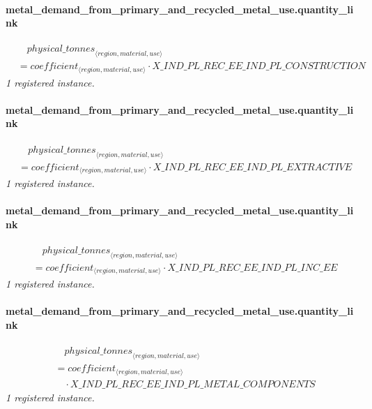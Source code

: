 \documentclass[11pt]{article}
\begin{document}
\paragraph{metal\_demand\_from\_primary\_and\_recycled\_metal\_use.quantity\_link}
\begin{align*}
&\quad {physical\_tonnes}_{\langle region, material, use\rangle}\\
&= coefficient_{\langle region, material, use\rangle} \cdot X\_IND\_PL\_REC\_EE\_IND\_PL\_CONSTRUCTION
\end{align*}
\noindent\emph{1 registered instance.}\par
\paragraph{metal\_demand\_from\_primary\_and\_recycled\_metal\_use.quantity\_link}
\begin{align*}
&\quad {physical\_tonnes}_{\langle region, material, use\rangle}\\
&= coefficient_{\langle region, material, use\rangle} \cdot X\_IND\_PL\_REC\_EE\_IND\_PL\_EXTRACTIVE
\end{align*}
\noindent\emph{1 registered instance.}\par
\paragraph{metal\_demand\_from\_primary\_and\_recycled\_metal\_use.quantity\_link}
\begin{align*}
&\quad {physical\_tonnes}_{\langle region, material, use\rangle}\\
&= coefficient_{\langle region, material, use\rangle} \cdot X\_IND\_PL\_REC\_EE\_IND\_PL\_INC\_EE
\end{align*}
\noindent\emph{1 registered instance.}\par
\paragraph{metal\_demand\_from\_primary\_and\_recycled\_metal\_use.quantity\_link}
\begin{align*}
&\quad {physical\_tonnes}_{\langle region, material, use\rangle}\\
&= coefficient_{\langle region, material, use\rangle}\\
&\quad {}\cdot X\_IND\_PL\_REC\_EE\_IND\_PL\_METAL\_COMPONENTS
\end{align*}
\noindent\emph{1 registered instance.}\par
\end{document}
